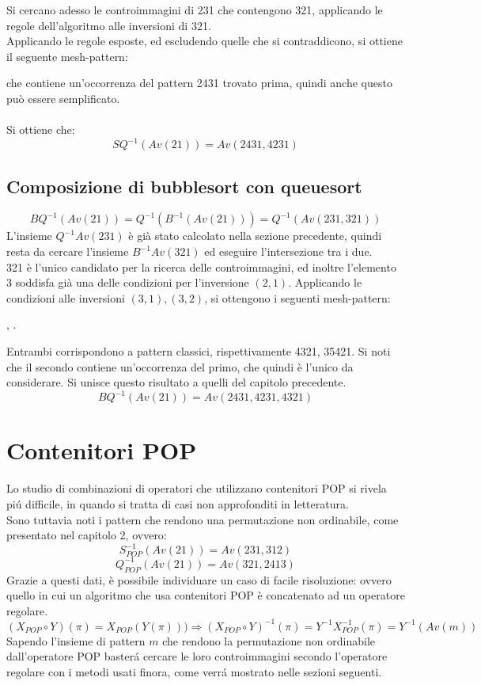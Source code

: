 Si cercano adesso le controimmagini di 231 che contengono 321, applicando le regole dell'algoritmo alle inversioni di 321.\\
Applicando le regole esposte, ed escludendo quelle che si contraddicono, si ottiene il seguente mesh-pattern: 
\begin{center}
\end{center}
che contiene un'occorrenza del pattern 2431 trovato prima, quindi anche questo pu\`o essere semplificato.\\\\
Si ottiene che:$$SQ^{-1}(Av(21)) = Av(2431, 4231)$$
\subsection{Composizione di {bubblesort} con {queuesort}}
$$BQ^{-1}(Av(21)) = Q^{-1}(B^{-1}(Av(21))) = Q^{-1}(Av(231,321))$$
L'insieme $Q^{-1}Av(231)$ \`e gi\`a stato calcolato nella sezione precedente, quindi resta da cercare l'insieme $B^{-1}Av(321)$ ed eseguire l'intersezione tra i due.\\321 \`e l'unico candidato per la ricerca delle controimmagini, ed inoltre l'elemento 3 soddisfa gi\`a una delle condizioni per l'inversione $(2,1)$. Applicando le condizioni alle inversioni $(3,1),(3,2)$, si ottengono i seguenti mesh-pattern:
\begin{center}
,
.
\end{center}  
Entrambi corrispondono a pattern classici, rispettivamente 4321, 35421. Si noti che il secondo contiene un'occorrenza del primo, che quindi \`e l'unico da considerare. Si unisce questo risultato a quelli del capitolo precedente.
$$BQ^{-1}(Av(21)) = Av(2431, 4231, 4321)$$ 
\section{Contenitori POP}
Lo studio di combinazioni di operatori che utilizzano contenitori POP si rivela pi\'u difficile, in quando si tratta di casi non approfonditi in letteratura.\\
Sono tuttavia noti i pattern che rendono una permutazione non ordinabile, come presentato nel capitolo 2, ovvero:
$$S_{POP}^{-1}(Av(21)) = Av(231,312)$$$$Q_{POP}^{-1}(Av(21))=Av(321,2413)$$
Grazie a questi dati, \`e possibile individuare un caso di facile risoluzione: ovvero quello in cui un algoritmo che usa contenitori POP \`e concatenato ad un operatore regolare.
$$(X_{POP}\circ{Y})(\pi)= X_{POP}(Y(\pi)))\Rightarrow(X_{POP}\circ{Y})^{-1}(\pi) = Y^{-1}X_{POP}^{-1}(\pi)=Y^{-1}(Av(m))$$
Sapendo l'insieme di pattern $m$ che rendono la permutazione non ordinabile dall'operatore POP baster\'a cercare le loro controimmagini secondo l'operatore regolare con i metodi usati finora, come verr\'a mostrato nelle sezioni seguenti.
